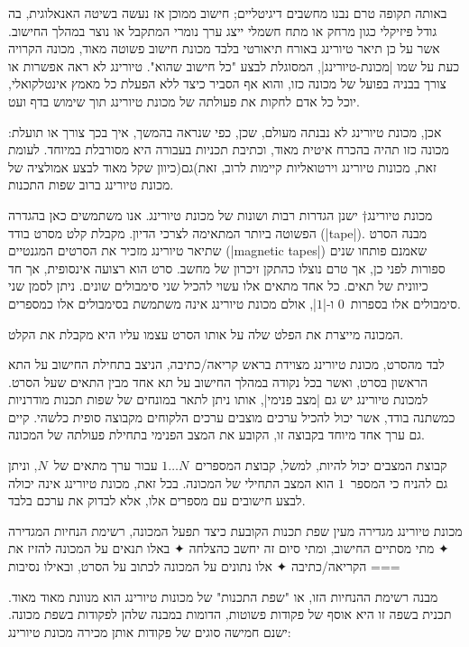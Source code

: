 באותה תקופה טרם נבנו מחשבים דיגיטליים; חישוב ממוכן אז נעשה בשיטה האנאלוגית,
בה גודל פיזיקלי כגון מרחק או מתח חשמלי ייצג ערך נומרי המתקבל או נוצר במהלך
החישוב. אשר על כן תיאר טיורינג באורח תיאורטי בלבד מכונת חישוב פשוטה מאוד, מכונה
הקרויה כעת על שמו \ע|מכונת-טיורינג|, המסוגלת לבצע "כל חישוב שהוא". טיורינג לא
ראה אפשרות או צורך בבניה בפועל של מכונה כזו, והוא אף הסביר כיצד ללא הפעלת כל
מאמץ אינטלקואלי, יוכל כל אדם לחקות את פעולתה של מכונת טיורינג תוך שימוש בדף
ועט.

אכן, מכונת טיורינג לא נבנתה מעולם, שכן, כפי שנראה בהמשך, איך בכך צורך או תועלת:
מכונה כזו תהיה בהכרח איטית מאוד, וכתיבת תכניות בעבורה היא מסורבלת במיוחד. לעומת
זאת, מכונות טיורינג וירטואליות קיימות לרוב, זאת)גם(כיוון שקל מאוד לבצע אמולציה
של מכונת טיורינג ברוב שפות התכנות.

מכונת טיורינג†{%
  ישנן הגדרות רבות ושונות של מכונת טיורינג. אנו משתמשים כאן בהגדרה הפשוטה ביותר
  המתאימה לצרכי הדיון.
}
מקבלת קלט מסרט בודד (\E|tape|). מבנה הסרט שתיאר טיורינג מזכיר את הסרטים
המגנטיים (\E|magnetic tapes|) שאמנם פותחו שנים ספורות לפני כן, אך טרם נוצלו
כהתקן זיכרון של מחשב. סרט הוא רצועה אינסופית, אך חד כיוונית של תאים. כל אחד
מתאים אלו עשוי להכיל שני סימבולים שונים. ניתן לסמן שני סימבולים אלו
בספרות~$0$ ו-\E|$1$|, אולם מכונת טיורינג אינה משתמשת בסימבולים אלו כמספרים.

המכונה מייצרת את הפלט שלה על אותו הסרט עצמו עליו היא מקבלת את הקלט.

לבד מהסרט, מכונת טיורינג מצוידת בראש קריאה/כתיבה, הניצב בתחילת החישוב על התא
הראשון בסרט, ואשר בכל נקודה במהלך החישוב על תא אחד מבין התאים שעל הסרט. למכונת
טיורינג יש גם \ע|מצב פנימי|, אותו ניתן לתאר במונחים של שפות תכנות מודרניות
כמשתנה בודד, אשר יכול להכיל ערכים מוצבים ערכים הלקוחים מקבוצה סופית כלשהי. קיים
גם ערך אחד מיוחד בקבוצה זו, הקובע את המצב הפנימי בתחילת פעולתה של המכונה.

קבוצת המצבים יכול להיות, למשל, קבוצת המספרים~$1…N$ עבור ערך מתאים של~$N$, וניתן
גם להניח כי המספר~$1$ הוא המצב התחילי של המכונה. בכל זאת, מכונת טיורינג אינה
יכולה לבצע חישובים עם מספרים אלו, אלא לבדוק את ערכם בלבד.

מכונת טיורינג מגדירה מעין שפת תכנות הקובעת כיצד תפעל המכונה, רשימת הנחיות המגדירה
✦ מתי מסתיים החישוב, ומתי סיום זה יחשב כהצלחה
✦ באלו תנאים על המכונה להזיז את הקריאה/כתיבה
✦ אלו נתונים על המכונה לכתוב על הסרט, ובאילו נסיבות
===

מבנה רשימת ההנחיות הזו, או "שפת התכנות" של מכונות טיורינג הוא מנוונת מאוד מאוד.
תכנית בשפה זו היא אוסף של פקודות פשוטות, הדומות במבנה שלהן לפקודות בשפת מכונה.
ישנם חמישה סוגים של פקודות אותן מכירה מכונת טיורינג:


